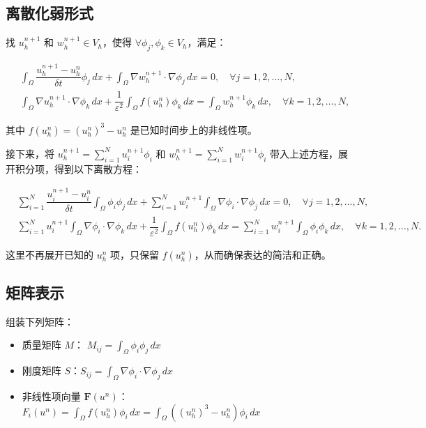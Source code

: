 \documentclass[12pt,a4paper]{article}
\begin{document}
	
	
	\subsection{离散化弱形式}
	
	找 \( u_h^{n+1} \) 和 \( w_h^{n+1} \in V_h \)，使得 \( \forall \phi_j, \phi_k \in V_h \)，满足：
	
	\begin{align}
		& \int_{\Omega} \dfrac{u_h^{n+1} - u_h^n}{\delta t} \phi_j \, dx + \int_{\Omega} \nabla w_h^{n+1} \cdot \nabla \phi_j \, dx = 0, \quad \forall j = 1,2,\ldots, N, \\
		& \int_{\Omega} \nabla u_h^{n+1} \cdot \nabla \phi_k \, dx + \dfrac{1}{\varepsilon^2} \int_{\Omega} f(u_h^n) \phi_k \, dx = \int_{\Omega} w_h^{n+1} \phi_k \, dx, \quad \forall k = 1,2,\ldots, N,
	\end{align}
	
	其中 \( f(u_h^n) = (u_h^n)^3 - u_h^n \) 是已知时间步上的非线性项。
	
	接下来，将 \( u_h^{n+1} = \sum_{i=1}^N u_i^{n+1} \phi_i \) 和 \( w_h^{n+1} = \sum_{i=1}^N w_i^{n+1} \phi_i \) 带入上述方程，展开积分项，得到以下离散方程：
	
	\begin{align}
		& \sum_{i=1}^N \dfrac{u_i^{n+1} - u_i^n}{\delta t} \int_{\Omega} \phi_i \phi_j \, dx + \sum_{i=1}^N w_i^{n+1} \int_{\Omega} \nabla \phi_i \cdot \nabla \phi_j \, dx = 0, \quad \forall j=1,2,\ldots,N, \\
		& \sum_{i=1}^N u_i^{n+1} \int_{\Omega} \nabla \phi_i \cdot \nabla \phi_k \, dx + \dfrac{1}{\varepsilon^2} \int_{\Omega} f(u_h^n) \phi_k \, dx = \sum_{i=1}^N w_i^{n+1} \int_{\Omega} \phi_i \phi_k \, dx, \quad \forall k=1,2,\ldots,N.
	\end{align}
	
	这里不再展开已知的 \( u_h^n \) 项，只保留 \( f(u_h^n) \)，从而确保表达的简洁和正确。
	
	
	
	\subsection{矩阵表示}
	
	组装下列矩阵：
	
	\begin{itemize}
		\item 质量矩阵 \( M \)： \( M_{ij} = \int_{\Omega} \phi_i \phi_j \, dx \)
		\item 刚度矩阵 \( S \)：\( S_{ij} = \int_{\Omega} \nabla \phi_i \cdot \nabla \phi_j \, dx \)
		\item 非线性项向量 \( \mathbf{F}(u^n) \)：\( F_i(u^n) = \int_{\Omega} f(u_h^n) \phi_i \, dx = \int_{\Omega} \left((u_h^n)^3 - u_h^n\right) \phi_i \, dx \)
	\end{itemize}
	
\end{document}
